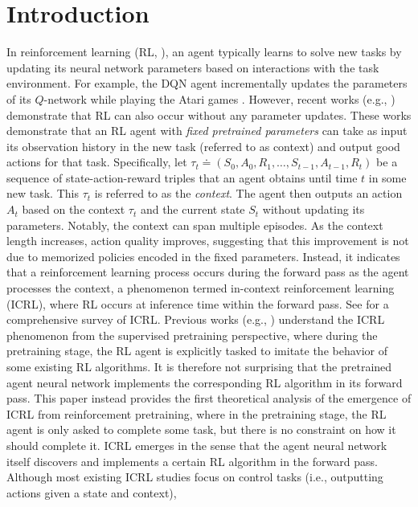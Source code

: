 \documentclass{article}
\begin{document}
\section{Introduction}
In reinforcement learning (RL, \citet{sutton2018reinforcement}), an agent typically learns to solve new tasks by updating its neural network parameters based on interactions with the task environment.
For example,
the DQN agent \citep{mnih2015human} incrementally updates the parameters of its $Q$-network while playing the Atari games \citep{bellemare13arcade}.
However,
recent works (e.g., \citet{duan2016rl,wang2016learning,laskin2022context})
demonstrate that RL can also occur without any parameter updates.
These works demonstrate that an RL agent with \emph{fixed pretrained parameters} can take as input its observation history in the new task (referred to as context) and output good actions for that task.
Specifically, let $\tau_t \doteq (S_0, A_0, R_1, \dots, S_{t-1}, A_{t-1}, R_t)$ be a sequence of state-action-reward triples that an agent obtains until time $t$ in some new task.
This $\tau_t$ is referred to as the \emph{context}. The agent then outputs an action $A_t$ based on the context $\tau_t$ and the current state $S_t$ without updating its parameters.
Notably, the context can span multiple episodes.
As the context length increases, action quality improves, suggesting that this improvement is not due to memorized policies encoded in the fixed parameters. Instead, it indicates that a reinforcement learning process occurs during the forward pass as the agent processes the context, a phenomenon termed in-context reinforcement learning (ICRL), where RL occurs at inference time within the forward pass.
See \citet{moeini2025survey} for a comprehensive survey of ICRL.
Previous works (e.g., \citet{lin2023transformers}) understand the ICRL phenomenon from the supervised pretraining perspective,
where during the pretraining stage,
the RL agent is explicitly tasked to imitate the behavior of some existing RL algorithms.
It is therefore not surprising that the pretrained agent neural network implements the corresponding RL algorithm in its forward pass.
This paper
instead provides the first theoretical analysis of the emergence of ICRL from reinforcement pretraining,
where in the pretraining stage,
the RL agent is only asked to complete some task, but there is no constraint on how it should complete it.
ICRL emerges in the sense that the agent neural network itself discovers and implements a certain RL algorithm in the forward pass.
Although most existing ICRL studies focus on control tasks (i.e., outputting actions given a state and context),
\end{document}
